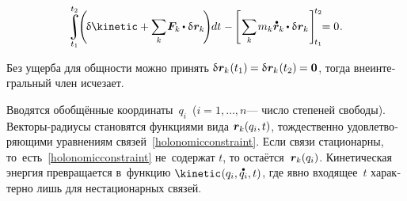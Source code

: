 \begin{otherlanguage}{russian}
\nopagebreak\vspace{-0.25em}\begin{equation}
\displaystyle \integral\displaylimits_{t_1}^{\raisemath{.12em}{t_2}}
\hspace{-0.8ex}
\left( \hspace{-0.25ex} \variation{\kinetic}
+ \scalebox{0.95}[0.98]{$ \displaystyle \sum_{\smash{k}} $} \hspace{.16ex} \bm{F}_k \hspace{-0.1ex} \dotp \variation{\hspace{.1ex}\locationvector_k} \hspace{-0.33ex} \right) \hspace{-0.5ex} dt \hspace{.1ex}
- \hspace{-0.2ex} \left[ \hspace{.2ex} \scalebox{0.95}[0.98]{$ \displaystyle \sum_{\smash{k}} $} \hspace{.2ex} m_k \mathdotabove{\locationvector}_k \hspace{-0.1ex} \dotp \variation{\hspace{.1ex}\locationvector_k} \hspace{.16ex} \right]_{\hspace{-0.32ex}t_1}^{\hspace{-0.32ex}t_2}
\hspace{-0.8ex} = 0
\hspace{.1ex} .
\end{equation}

\vspace{-0.16em}\noindent
Без ущерба для общности можно принять ${\variation{\hspace{.1ex}\locationvector_k}\hspace{.1ex}(t_1) \hspace{-0.1ex} = \variation{\hspace{.1ex}\locationvector_k}\hspace{.1ex}(t_2) \hspace{-0.1ex} = \bm{0}}$, тогда внеинтегральный член исчезает.

Вводятся обобщённые координаты~$q_i$~(${i = 1, \ldots, n}$\:--- число степеней свободы).
Векторы-радиусы становятся функциями \hbox{вида} ${\bm{r}_{k}(q_i, t)}$, тождественно удовлетворяющими уравнениям связей~\eqref{holonomicconstraint}.
Если связи стационарны, то~есть~\eqref{holonomicconstraint} не~содержат $t$, то остаётся~${\bm{r}_{k}(q_i)}$.
Кинетическая энергия превращается в~функцию ${\kinetic \hspace{.1ex} (q_i, \mathdotabove{q}_i, t)}$, где явно входящее~$t$ характерно лишь для нестационарных связей.


\end{otherlanguage}
